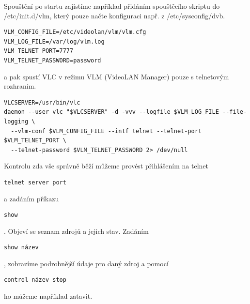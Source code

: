 \vspace{10pt}

Spouštění po startu zajistíme například přidáním spouštěcího skriptu do /etc/init.d/vlm, který pouze načte konfiguraci např. z /etc/sysconfig/dvb.

\vspace{10pt}

\begin{small}
\begin{verbatim}
VLM_CONFIG_FILE=/etc/videolan/vlm/vlm.cfg
VLM_LOG_FILE=/var/log/vlm.log
VLM_TELNET_PORT=7777
VLM_TELNET_PASSWORD=password
\end{verbatim}
\end{small}

\vspace{10pt}

a pak spustí VLC v režimu VLM (VideoLAN Manager) pouze s telnetovým rozhraním.

\vspace{10pt}

\begin{small}
\begin{verbatim}
VLCSERVER=/usr/bin/vlc
daemon --user vlc "$VLCSERVER" -d -vvv --logfile $VLM_LOG_FILE --file-logging \
  --vlm-conf $VLM_CONFIG_FILE --intf telnet --telnet-port $VLM_TELNET_PORT \
  --telnet-password $VLM_TELNET_PASSWORD 2> /dev/null
\end{verbatim}
\end{small}

\vspace{10pt}

Kontrolu zda vše správně běží můžeme provést přihlášením na telnet \begin{small}\begin{verbatim}telnet server port\end{verbatim}\end{small} a zadáním příkazu \begin{small}\begin{verbatim}show\end{verbatim}\end{small}. Objeví se seznam zdrojů a jejich stav. Zadáním \begin{small}\begin{verbatim}show název\end{verbatim}\end{small}, zobrazíme podrobnější údaje pro daný zdroj a pomocí \begin{small}\begin{verbatim}control název stop\end{verbatim}\end{small} ho můžeme například zatavit.


